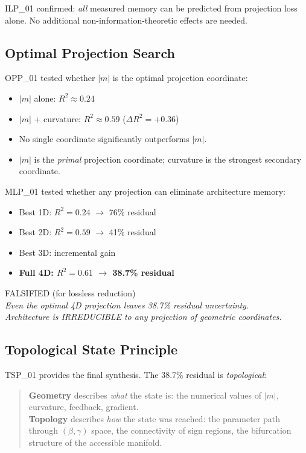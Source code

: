 \documentclass[11pt,a4paper,oneside]{report}
\newcommand{\falsified}{\textcolor{falsified}{FALSIFIED}}
\begin{document}
ILP\_01 confirmed: \textit{all} measured memory can be predicted from
projection loss alone. No additional non-information-theoretic effects
are needed.

\subsection{Optimal Projection Search}

OPP\_01 tested whether $|m|$ is the optimal projection coordinate:
\begin{itemize}[nosep]
  \item $|m|$ alone: $R^2 \approx 0.24$
  \item $|m|$ + curvature: $R^2 \approx 0.59$ ($\Delta R^2 = +0.36$)
  \item No single coordinate significantly outperforms $|m|$.
  \item $|m|$ is the \textit{primal} projection coordinate; curvature is
    the strongest secondary coordinate.
\end{itemize}

MLP\_01 tested whether any projection can eliminate architecture memory:
\begin{itemize}[nosep]
  \item Best 1D: $R^2 = 0.24$ $\rightarrow$ 76\% residual
  \item Best 2D: $R^2 = 0.59$ $\rightarrow$ 41\% residual
  \item Best 3D: incremental gain
  \item \textbf{Full 4D: $R^2 = 0.61$ $\rightarrow$ 38.7\% residual}
\end{itemize}

\begin{center}
\falsified{} (for lossless reduction)\\[4pt]
\textit{Even the optimal 4D projection leaves 38.7\% residual uncertainty.}\\[2pt]
\textit{Architecture is IRREDUCIBLE to any projection of geometric coordinates.}
\end{center}

\subsection{Topological State Principle}

TSP\_01 provides the final synthesis. The 38.7\% residual is \textit{topological}:

\begin{quote}
  \textbf{Geometry} describes \textit{what} the state is: the numerical values
  of $|m|$, curvature, feedback, gradient.\\
  \textbf{Topology} describes \textit{how} the state was reached: the parameter
  path through $(\beta, \gamma)$ space, the connectivity of sign regions,
  the bifurcation structure of the accessible manifold.
\end{quote}
\end{document}
